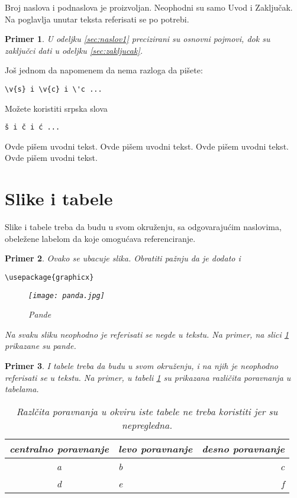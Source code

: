\documentclass[a4paper]{article}
\newtheorem{primer}{Primer}[section]
\begin{document}
Broj naslova i podnaslova je proizvoljan. Neophodni su samo Uvod i Zaključak. Na poglavlja unutar teksta referisati se po potrebi. 
\begin{primer}
U odeljku \ref{sec:naslov1} precizirani su osnovni pojmovi, dok su zaključci dati u odeljku \ref{sec:zakljucak}.
\end{primer}

Još jednom da napomenem da nema razloga da pišete:
\begin{verbatim}
\v{s} i \v{c} i \'c ...
\end{verbatim}
Možete koristiti srpska slova
\begin{verbatim}
š i č i ć ... 
\end{verbatim}


Ovde pišem uvodni tekst.
Ovde pišem uvodni tekst. 
Ovde pišem uvodni tekst. 
Ovde pišem uvodni tekst. 


\section{Slike i tabele}
\label{slike_i_tabele}

Slike i tabele treba da budu u svom okruženju, sa odgovarajućim naslovima, obeležene labelom da koje omogućava referenciranje. 

\begin{primer} Ovako se ubacuje slika. Obratiti pažnju da je dodato i 
\begin{verbatim}
\usepackage{graphicx}
\end{verbatim}

\begin{figure}[h!]
\begin{center}
\texttt{[image: panda.jpg]}
\end{center}
\caption{Pande}
\label{fig:pande}
\end{figure}

Na svaku sliku neophodno je referisati se negde u tekstu. Na primer, na slici \ref{fig:pande} prikazane su pande. 
\end{primer}

\begin{primer} I tabele treba da budu u svom okruženju, i na njih je neophodno referisati se u tekstu. Na primer, u tabeli \ref{tab:tabela1} su prikazana različita poravnanja u tabelama.

\begin{table}[h!]
\begin{center}
\caption{Razlčita poravnanja u okviru iste tabele ne treba koristiti jer su nepregledna.}
\begin{tabular}{|c|l|r|} \hline
centralno poravnanje& levo poravnanje& desno poravnanje\\ \hline
a &b&c\\ \hline
d &e&f\\ \hline
\end{tabular}
\label{tab:tabela1}
\end{center}
\end{table}

\end{primer}
\end{document}
